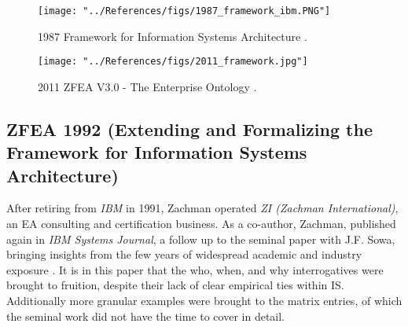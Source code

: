 \documentclass[12pt,conference]{IEEEtran}
\begin{document}
\begin{figure}[htbp]
    \centerline{\texttt{[image: "../References/figs/1987\_framework\_ibm.PNG"]}}
    \caption{1987 Framework for Information Systems Architecture \cite{zachman_ibm_1987}.}
    \label{fig:1987_framework_ibm}
\end{figure}

\begin{figure*}[htbp]
    \centerline{\texttt{[image: "../References/figs/2011\_framework.jpg"]}}
    \caption{2011 ZFEA V3.0 - The Enterprise Ontology \cite{Zachman_Evolution}.}
    \label{fig:2011_framework}
\end{figure*}

\subsection{ZFEA 1992 (Extending and Formalizing the Framework for Information Systems Architecture)}\label{II-B}
After retiring from \emph{IBM} in 1991, Zachman operated \emph{ZI (Zachman International)}, an EA consulting and certification business. 
As a co-author, Zachman, published again in \emph{IBM Systems Journal}, a follow up to the seminal paper with J.F. Sowa, bringing insights from the few years of widespread academic and industry exposure \cite{zachman_ibm_1992}. 
It is in this paper that the who, when, and why interrogatives were brought to fruition, despite their lack of clear empirical ties within IS.
Additionally more granular examples were brought to the matrix entries, of which the seminal work did not have the time to cover in detail. 
\end{document}
